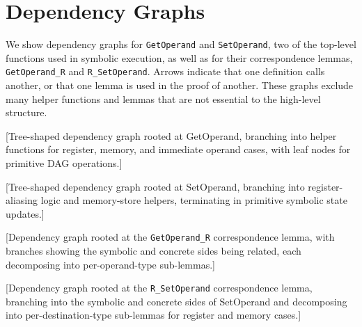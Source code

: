 \chapter{Dependency Graphs}
\label{app:dep-graphs}

We show dependency graphs for \texttt{GetOperand} and \texttt{SetOperand}, two of the top-level functions used in symbolic execution, as well as for their correspondence lemmas, \texttt{GetOperand\_R} and \texttt{R\_SetOperand}.
Arrows indicate that one definition calls another, or that one lemma is used in the proof of another.
These graphs exclude many helper functions and lemmas that are not essential to the high-level structure.

[Tree-shaped dependency graph rooted at GetOperand, branching into helper functions for register, memory, and immediate operand cases, with leaf nodes for primitive DAG operations.]

[Tree-shaped dependency graph rooted at SetOperand, branching into register-aliasing logic and memory-store helpers, terminating in primitive symbolic state updates.]

[Dependency graph rooted at the \texttt{GetOperand\_R} correspondence lemma, with branches showing the symbolic and concrete sides being related, each decomposing into per-operand-type sub-lemmas.]

[Dependency graph rooted at the \texttt{R\_SetOperand} correspondence lemma, branching into the symbolic and concrete sides of SetOperand and decomposing into per-destination-type sub-lemmas for register and memory cases.]
